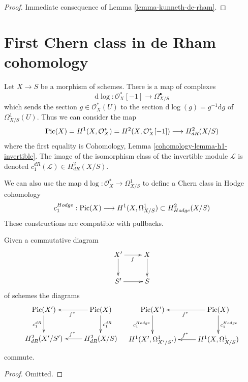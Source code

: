 \begin{proof}
Immediate consequence of Lemma \ref{lemma-kunneth-de-rham}.
\end{proof}







\section{First Chern class in de Rham cohomology}
\label{section-first-chern-class}

\noindent
Let $X \to S$ be a morphism of schemes. There is a map of complexes
$$
\text{d}\log : \mathcal{O}_X^*[-1] \longrightarrow \Omega^\bullet_{X/S}
$$
which sends the section $g \in \mathcal{O}_X^*(U)$ to the section
$\text{d}\log(g) = g^{-1}\text{d}g$ of $\Omega^1_{X/S}(U)$.
Thus we can consider the map
$$
\mathop{\mathrm{Pic}}\nolimits(X) = H^1(X, \mathcal{O}_X^*) =
H^2(X, \mathcal{O}_X^*[-1]) \longrightarrow H^2_{dR}(X/S)
$$
where the first equality is
Cohomology, Lemma \ref{cohomology-lemma-h1-invertible}.
The image of the isomorphism class of the invertible module
$\mathcal{L}$ is denoted $c^{dR}_1(\mathcal{L}) \in H^2_{dR}(X/S)$.

\medskip\noindent
We can also use the map $\text{d}\log : \mathcal{O}_X^* \to \Omega^1_{X/S}$
to define a Chern class in Hodge cohomology
$$
c_1^{Hodge} : \mathop{\mathrm{Pic}}\nolimits(X) \longrightarrow H^1(X, \Omega^1_{X/S})
\subset H^2_{Hodge}(X/S)
$$
These constructions are compatible with pullbacks.

\begin{lemma}
\label{lemma-pullback-c1}
Given a commutative diagram
$$
\xymatrix{
X' \ar[r]_f \ar[d] & X \ar[d] \\
S' \ar[r] & S
}
$$
of schemes the diagrams
$$
\xymatrix{
\Pic(X') \ar[d]_{c_1^{dR}} &
\Pic(X) \ar[d]^{c_1^{dR}} \ar[l]^{f^*} \\
H^2_{dR}(X'/S') &
H^2_{dR}(X/S) \ar[l]_{f^*}
}
\quad
\xymatrix{
\Pic(X') \ar[d]_{c_1^{Hodge}} &
\Pic(X) \ar[d]^{c_1^{Hodge}} \ar[l]^{f^*} \\
H^1(X', \Omega^1_{X'/S'}) &
H^1(X, \Omega^1_{X/S}) \ar[l]_{f^*}
}
$$
commute.
\end{lemma}

\begin{proof}
Omitted.
\end{proof}

